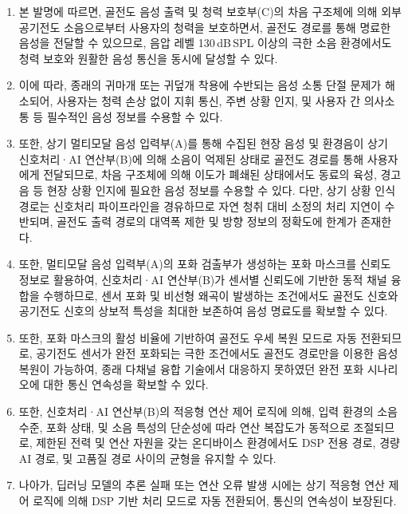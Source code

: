 \documentclass{article}
\begin{document}
\begin{enumerate}[label = \textbf{(\arabic*)}]

    \item 본 발명에 따르면, 골전도 음성 출력 및 청력 보호부(C)의 차음 구조체에 의해 외부 공기전도 소음으로부터 사용자의 청력을 보호하면서, 골전도 경로를 통해 명료한 음성을 전달할 수 있으므로, 음압 레벨 130\,dB\,SPL 이상의 극한 소음 환경에서도 청력 보호와 원활한 음성 통신을 동시에 달성할 수 있다. 
    
    \item 이에 따라, 종래의 귀마개 또는 귀덮개 착용에 수반되는 음성 소통 단절 문제가 해소되어, 사용자는 청력 손상 없이 지휘 통신, 주변 상황 인지, 및 사용자 간 의사소통 등 필수적인 음성 정보를 수용할 수 있다.

    \item 또한, 상기 멀티모달 음성 입력부(A)를 통해 수집된 현장 음성 및 환경음이 상기 신호처리·AI 연산부(B)에 의해 소음이 억제된 상태로 골전도 경로를 통해 사용자에게 전달되므로, 차음 구조체에 의해 이도가 폐쇄된 상태에서도 동료의 육성, 경고음 등 현장 상황 인지에 필요한 음성 정보를 수용할 수 있다. 다만, 상기 상황 인식 경로는 신호처리 파이프라인을 경유하므로 자연 청취 대비 소정의 처리 지연이 수반되며, 골전도 출력 경로의 대역폭 제한 및 방향 정보의 정확도에 한계가 존재한다.
    

    \item 또한, 멀티모달 음성 입력부(A)의 포화 검출부가 생성하는 포화 마스크를 신뢰도 정보로 활용하여, 신호처리·AI 연산부(B)가 센서별 신뢰도에 기반한 동적 채널 융합을 수행하므로, 센서 포화 및 비선형 왜곡이 발생하는 조건에서도 골전도 신호와 공기전도 신호의 상보적 특성을 최대한 보존하여 음성 명료도를 확보할 수 있다.

    \item 또한, 포화 마스크의 활성 비율에 기반하여 골전도 우세 복원 모드로 자동 전환되므로, 공기전도 센서가 완전 포화되는 극한 조건에서도 골전도 경로만을 이용한 음성 복원이 가능하여, 종래 다채널 융합 기술에서 대응하지 못하였던 완전 포화 시나리오에 대한 통신 연속성을 확보할 수 있다.
    
    \item 또한, 신호처리·AI 연산부(B)의 적응형 연산 제어 로직에 의해, 입력 환경의 소음 수준, 포화 상태, 및 소음 특성의 단순성에 따라 연산 복잡도가 동적으로 조절되므로, 제한된 전력 및 연산 자원을 갖는 온디바이스 환경에서도 DSP 전용 경로, 경량 AI 경로, 및 고품질 경로 사이의 균형을 유지할 수 있다. 

    \item 나아가, 딥러닝 모델의 추론 실패 또는 연산 오류 발생 시에는 상기 적응형 연산 제어 로직에 의해 DSP 기반 처리 모드로 자동 전환되어, 통신의 연속성이 보장된다.


\end{enumerate}
\end{document}
